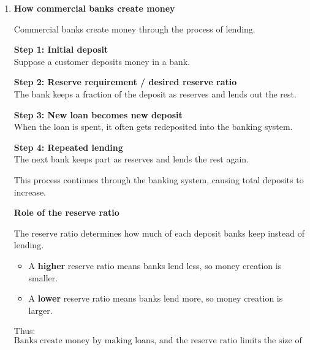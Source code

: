 \documentclass[12pt]{article}
\begin{document}
\begin{enumerate}[label=\textbf{\arabic*.}]
\textbf{Currency vs. deposits}
\begin{itemize}
    \item \textbf{Currency} means physical money, such as bank notes and coins.
    \item \textbf{Deposits} are balances held in bank accounts.
\end{itemize}

\textbf{Why are some assets included in the money supply while others are not?}

The key criterion is \textbf{liquidity}. Assets included in the money supply can be used directly or very easily for transactions.

\begin{itemize}
    \item Currency and chequable deposits are highly liquid.
    \item Long-term bonds and some financial assets are not included because they are not used directly to buy goods and services.
\end{itemize}

\textbf{Conclusion:} The more easily an asset can be used for transactions, the more likely it is to be included in the money supply.

\item \textbf{How commercial banks create money}

Commercial banks create money through the process of lending.

\textbf{Step 1: Initial deposit}\\
Suppose a customer deposits money in a bank.

\textbf{Step 2: Reserve requirement / desired reserve ratio}\\
The bank keeps a fraction of the deposit as reserves and lends out the rest.

\textbf{Step 3: New loan becomes new deposit}\\
When the loan is spent, it often gets redeposited into the banking system.

\textbf{Step 4: Repeated lending}\\
The next bank keeps part as reserves and lends the rest again.

This process continues through the banking system, causing total deposits to increase.

\textbf{Role of the reserve ratio}

The reserve ratio determines how much of each deposit banks keep instead of lending.

\begin{itemize}
    \item A \textbf{higher} reserve ratio means banks lend less, so money creation is smaller.
    \item A \textbf{lower} reserve ratio means banks lend more, so money creation is larger.
\end{itemize}

Thus:
\[
\boxed{\text{Banks create money by making loans, and the reserve ratio limits the size of deposit creation.}}
\]

\end{enumerate}
\end{document}
